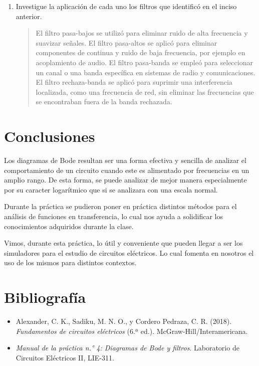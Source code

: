 \documentclass[12pt,a4paper]{article}
\begin{document}
\begin{enumerate}
\item Investigue la aplicación de cada uno los filtros que identificó en el inciso anterior.
\begin{quote}
El filtro pasa-bajos se utilizó para eliminar ruido de alta frecuencia y suavizar señales. El filtro pasa-altos se aplicó para eliminar componentes de continua y ruido de baja frecuencia, por ejemplo en acoplamiento de audio. El filtro pasa-banda se empleó para seleccionar un canal o una banda específica en sistemas de radio y comunicaciones. El filtro rechaza-banda se aplicó para suprimir una interferencia localizada, como una frecuencia de red, sin eliminar las frecuencias que se encontraban fuera de la banda rechazada.
\end{quote}
\end{enumerate}

\section{Conclusiones}
\begin{itemsinforme}
    \item Los diagramas de Bode resultan ser una forma efectiva y sencilla de analizar el comportamiento de un circuito cuando este es alimentado por frecuencias en un amplio rango. De esta forma, se puede analizar de mejor manera especialmente por su caracter logarítmico que si se analizara con una escala normal.
    \item Durante la práctica se pudieron poner en práctica distintos métodos para el análisis de funciones en transferencia, lo cual nos ayuda a solidificar los conocimientos adquiridos durante la clase.
    \item Vimos, durante esta práctica, lo útil y conveniente que pueden llegar a ser los simuladores para el estudio de circuitos eléctricos. Lo cual fomenta en nosotros el uso de los mismos para distintos contextos.
\end{itemsinforme}

\section{Bibliografía}
\begin{itemize}
    \item Alexander, C. K., Sadiku, M. N. O., y Cordero Pedraza, C. R. (2018). \textit{Fundamentos de circuitos eléctricos} (6.ª ed.). McGraw-Hill/Interamericana.
    \item \textit{Manual de la práctica n.° 4: Diagramas de Bode y filtros}. Laboratorio de Circuitos Eléctricos II, LIE-311.
\end{itemize}
\end{document}
